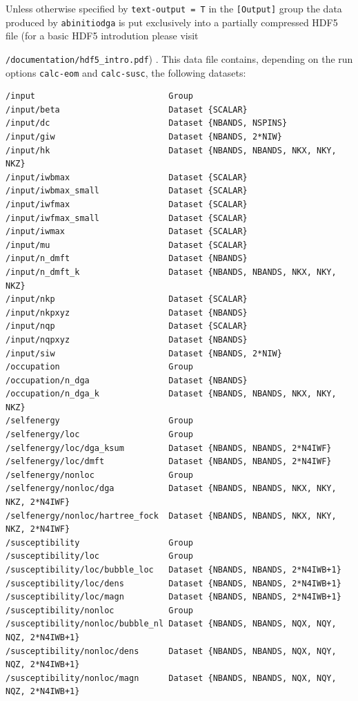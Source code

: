 \documentclass[a4paper,11pt]{article}
\numberwithin{equation}{section} %
\begin{document}
\newpage
Unless otherwise specified by \verb|text-output = T| in the {\color{red}\verb|[Output]|} group the data produced by \verb+abinitiodga+ is put exclusively into a partially compressed HDF5 file (for a basic HDF5 introdution please visit

{\color{blue}\verb+/documentation/hdf5_intro.pdf+}) . This data file contains, depending on the run options \verb|calc-eom| and \verb|calc-susc|, the following datasets:

\begin{lstlisting}[caption=ADGA HDF5 output format for a q-grid, frame=single, basicstyle=\small]
/input                           Group
/input/beta                      Dataset {SCALAR}
/input/dc                        Dataset {NBANDS, NSPINS}
/input/giw                       Dataset {NBANDS, 2*NIW}
/input/hk                        Dataset {NBANDS, NBANDS, NKX, NKY, NKZ}
/input/iwbmax                    Dataset {SCALAR}
/input/iwbmax_small              Dataset {SCALAR}
/input/iwfmax                    Dataset {SCALAR}
/input/iwfmax_small              Dataset {SCALAR}
/input/iwmax                     Dataset {SCALAR}
/input/mu                        Dataset {SCALAR}
/input/n_dmft                    Dataset {NBANDS}
/input/n_dmft_k                  Dataset {NBANDS, NBANDS, NKX, NKY, NKZ}
/input/nkp                       Dataset {SCALAR}
/input/nkpxyz                    Dataset {NBANDS}
/input/nqp                       Dataset {SCALAR}
/input/nqpxyz                    Dataset {NBANDS}
/input/siw                       Dataset {NBANDS, 2*NIW}
/occupation                      Group
/occupation/n_dga                Dataset {NBANDS}
/occupation/n_dga_k              Dataset {NBANDS, NBANDS, NKX, NKY, NKZ}
/selfenergy                      Group
/selfenergy/loc                  Group
/selfenergy/loc/dga_ksum         Dataset {NBANDS, NBANDS, 2*N4IWF}
/selfenergy/loc/dmft             Dataset {NBANDS, NBANDS, 2*N4IWF}
/selfenergy/nonloc               Group
/selfenergy/nonloc/dga           Dataset {NBANDS, NBANDS, NKX, NKY, NKZ, 2*N4IWF}
/selfenergy/nonloc/hartree_fock  Dataset {NBANDS, NBANDS, NKX, NKY, NKZ, 2*N4IWF}
/susceptibility                  Group
/susceptibility/loc              Group
/susceptibility/loc/bubble_loc   Dataset {NBANDS, NBANDS, 2*N4IWB+1}
/susceptibility/loc/dens         Dataset {NBANDS, NBANDS, 2*N4IWB+1}
/susceptibility/loc/magn         Dataset {NBANDS, NBANDS, 2*N4IWB+1}
/susceptibility/nonloc           Group
/susceptibility/nonloc/bubble_nl Dataset {NBANDS, NBANDS, NQX, NQY, NQZ, 2*N4IWB+1}
/susceptibility/nonloc/dens      Dataset {NBANDS, NBANDS, NQX, NQY, NQZ, 2*N4IWB+1}
/susceptibility/nonloc/magn      Dataset {NBANDS, NBANDS, NQX, NQY, NQZ, 2*N4IWB+1}
\end{lstlisting}
\end{document}
